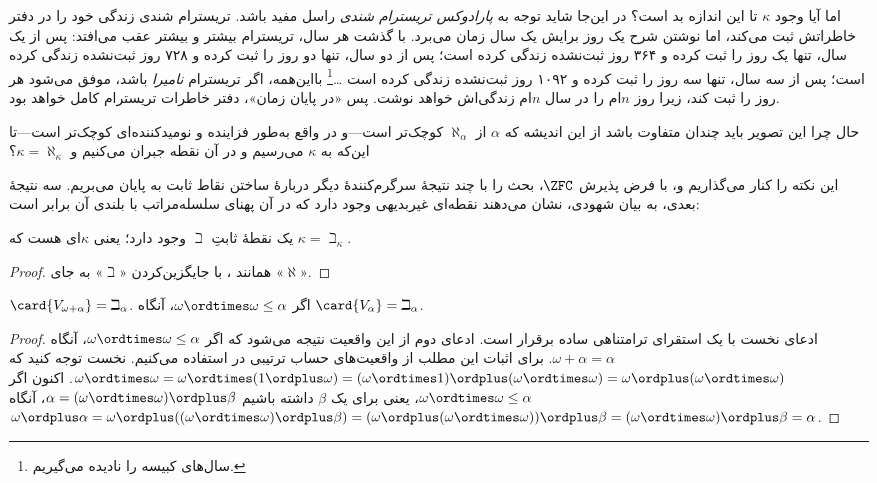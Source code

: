 \documentclass[../../../include/open-logic-section]{subfiles}
\begin{document}
اما آیا وجود $\kappa$ تا این اندازه بد است؟ در این‌جا شاید توجه به
\emph{پارادوکس تریسترام شندی} راسل مفید باشد. تریسترام شندی زندگی خود را
در دفتر خاطراتش ثبت می‌کند، اما نوشتن شرح یک روز برایش یک سال زمان
می‌برد. با گذشت هر سال، تریسترام بیشتر و بیشتر عقب می‌افتد: پس از یک
سال، تنها یک روز را ثبت کرده و ۳۶۴ روز ثبت‌نشده زندگی کرده است؛ پس از دو
سال، تنها دو روز را ثبت کرده و ۷۲۸ روز ثبت‌نشده زندگی کرده است؛ پس از سه
سال، تنها سه روز را ثبت کرده و ۱۰۹۲ روز ثبت‌نشده زندگی کرده است
\dots\footnote{سال‌های کبیسه را نادیده می‌گیریم.} بااین‌همه، اگر
تریسترام \emph{نامیرا} باشد، موفق می‌شود هر روز را ثبت کند، زیرا روز
$n$ام را در سال $n$ام زندگی‌اش خواهد نوشت. پس «در پایان زمان»، دفتر
خاطرات تریسترام کامل خواهد بود.

حال چرا این تصویر باید چندان متفاوت باشد از این اندیشه که $\alpha$ از
$\aleph_\alpha$ کوچک‌تر است---و در واقع به‌طور فزاینده و نومیدکننده‌ای
کوچک‌تر است---تا این‌که به $\kappa$ می‌رسیم و در آن نقطه جبران می‌کنیم
و $\kappa = \aleph_\kappa$؟

این نکته را کنار می‌گذاریم و، با فرض پذیرش $\ZFC$، بحث را با چند نتیجهٔ
سرگرم‌کنندهٔ دیگر دربارهٔ ساختن نقاط ثابت به پایان می‌بریم. سه نتیجهٔ
بعدی، به بیان شهودی، نشان می‌دهند نقطه‌ای غیربدیهی وجود دارد که در آن
پهنای سلسله‌مراتب با بلندی آن برابر است:

\begin{prop}
یک نقطهٔ ثابتِ $\beth$ وجود دارد؛ یعنی $\kappa$ای هست که
$\kappa= \beth_\kappa$.
\end{prop}

\begin{proof}
همانند ، با جایگزین‌کردن «$\beth$» به جای
«$\aleph$».
\end{proof}

\begin{prop}
$\card{V_{\omega+\alpha}} = \beth_{\alpha}$. اگر
$\omega \ordtimes \omega \leq \alpha$، آنگاه
$\card{V_\alpha} = \beth_\alpha$.
\end{prop}

\begin{proof}
ادعای نخست با یک استقرای ترامتناهی ساده برقرار است. ادعای دوم از این
واقعیت نتیجه می‌شود که اگر $\omega \ordtimes \omega \leq \alpha$،
آنگاه $\omega + \alpha = \alpha$. برای اثبات این مطلب از واقعیت‌های
حساب ترتیبی در  استفاده می‌کنیم. نخست
توجه کنید که
$\omega \ordtimes \omega = \omega \ordtimes (1 \ordplus \omega) =
(\omega \ordtimes 1) \ordplus (\omega\ordtimes\omega) = \omega
\ordplus (\omega \ordtimes \omega)$. اکنون اگر
$\omega \ordtimes \omega \leq \alpha$، یعنی برای یک $\beta$ داشته باشیم
$\alpha = (\omega\ordtimes\omega) \ordplus \beta$، آنگاه
$\omega \ordplus \alpha = \omega \ordplus
((\omega \ordtimes \omega) \ordplus \beta) =
(\omega \ordplus (\omega \ordtimes \omega)) \ordplus \beta =
(\omega \ordtimes \omega) \ordplus \beta = \alpha$.
\end{proof}
\end{document}
